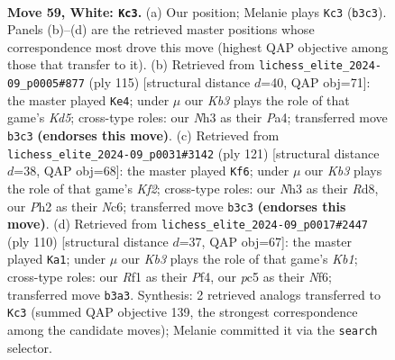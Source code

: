 \documentclass[11pt]{article}
\begin{document}
\clearpage

\begin{figure}[p]\centering
\begin{subfigure}{0.46\textwidth}\centering
\resizebox{\linewidth}{!}{%
\newchessgame
\chessboard[
  setfen={8/6k1/1pb5/p1p5/8/1K4PN/1r2rp1P/5R2 w - - 0 59},
  showmover=false,
  pgfstyle=straightmove, color=movearrow, markmove={b3-c3}
]}
\caption{}
\end{subfigure}\hfill
\begin{subfigure}{0.46\textwidth}\centering
\resizebox{\linewidth}{!}{%
\newchessgame
\chessboard[
  setfen={8/8/4p3/3b3p/pP1k4/P1RR4/2P2K2/r7 b - - 4 58},
  showmover=false,
  pgfstyle=straightmove, color=movearrow, markmove={d4-e4}
]}
\caption{}
\end{subfigure}
\\[4pt]
\begin{subfigure}{0.46\textwidth}\centering
\resizebox{\linewidth}{!}{%
\newchessgame
\chessboard[
  setfen={3r4/5k1P/2n3B1/1p1p2R1/pP3PP1/P7/3K4/8 b - - 4 61},
  showmover=false,
  pgfstyle=straightmove, color=movearrow, markmove={f7-f6}
]}
\caption{}
\end{subfigure}\hfill
\begin{subfigure}{0.46\textwidth}\centering
\resizebox{\linewidth}{!}{%
\newchessgame
\chessboard[
  setfen={6R1/1p3p1p/5Npk/p3P3/5P2/8/1rr5/1K1R4 w - - 29 56},
  showmover=false,
  pgfstyle=straightmove, color=movearrow, markmove={b1-a1}
]}
\caption{}
\end{subfigure}
\caption{\textbf{Move 59, White: \texttt{Kc3}.} (a) Our position; Melanie plays \texttt{Kc3} (\texttt{b3c3}). Panels (b)--(d) are the retrieved master positions whose correspondence most drove this move (highest QAP objective among those that transfer to it). (b) Retrieved from \texttt{lichess\_elite\_2024-09\_p0005\#877} (ply 115) [structural distance $d$=40, QAP obj=71]: the master played \texttt{Ke4}; under $\mu$ our \emph{Kb3} plays the role of that game's \emph{Kd5}; cross-type roles: our \emph{N}h3 as their \emph{P}a4; transferred move \texttt{b3c3} \textbf{(endorses this move)}. (c) Retrieved from \texttt{lichess\_elite\_2024-09\_p0031\#3142} (ply 121) [structural distance $d$=38, QAP obj=68]: the master played \texttt{Kf6}; under $\mu$ our \emph{Kb3} plays the role of that game's \emph{Kf2}; cross-type roles: our \emph{N}h3 as their \emph{R}d8, our \emph{P}h2 as their \emph{N}c6; transferred move \texttt{b3c3} \textbf{(endorses this move)}. (d) Retrieved from \texttt{lichess\_elite\_2024-09\_p0017\#2447} (ply 110) [structural distance $d$=37, QAP obj=67]: the master played \texttt{Ka1}; under $\mu$ our \emph{Kb3} plays the role of that game's \emph{Kb1}; cross-type roles: our \emph{R}f1 as their \emph{P}f4, our \emph{p}c5 as their \emph{N}f6; transferred move \texttt{b3a3}. Synthesis: 2 retrieved analogs transferred to \texttt{Kc3} (summed QAP objective 139, the strongest correspondence among the candidate moves); Melanie committed it via the \texttt{search} selector.}
\label{fig:thought-m116}
\end{figure}
\end{document}

